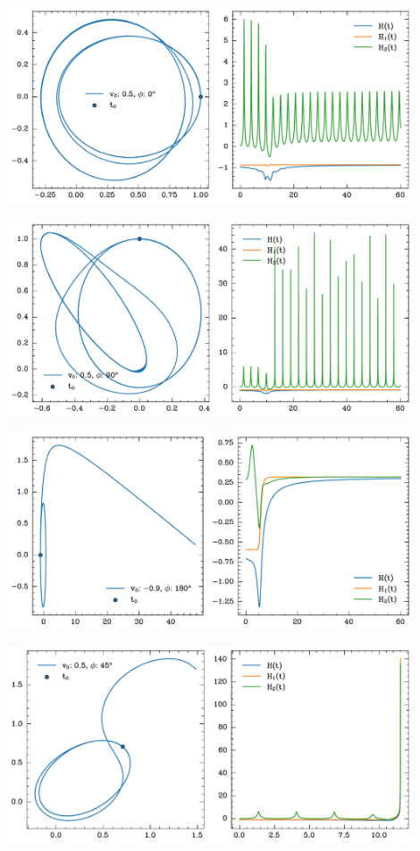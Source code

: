 \begin{center}
    \includegraphics[width=0.9\textwidth]{../images/3-1-0.pdf}
\end{center}
\begin{center}
    \includegraphics[width=0.9\textwidth]{../images/3-1-2.pdf}
\end{center}

\begin{center}
    \includegraphics[width=0.9\textwidth]{../images/3-1-60.pdf}
\end{center}
\begin{center}
    \includegraphics[width=0.9\textwidth]{../images/3-1-1.pdf}
\end{center}

